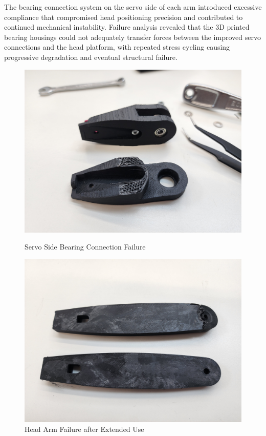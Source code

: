 The bearing connection system on the servo side of each arm introduced excessive compliance that compromised head positioning precision and contributed to continued mechanical instability. Failure analysis revealed that the 3D printed bearing housings could not adequately transfer forces between the improved servo connections and the head platform, with repeated stress cycling causing progressive degradation and eventual structural failure.

\begin{figure}[htbp]
    \centering
    \begin{minipage}{0.45\textwidth}
        \centering
        \includegraphics[width=\textwidth]{Images/HeadArmFailure (3).jpg}
        \caption{Servo Side Bearing Connection Failure}
        \label{fig:servo_bearing_failure}
    \end{minipage}
    \hfill
    \begin{minipage}{0.45\textwidth}
        \centering
        \includegraphics[width=\textwidth]{Images/HeadArmFailure.jpg}
        \caption{Head Arm Failure after Extended Use}
        \label{fig:head_arm_failure_alt}
    \end{minipage}
\end{figure}

